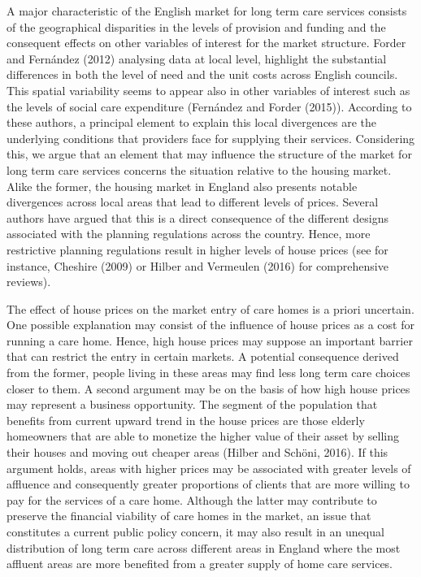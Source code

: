 \documentclass[11pt,a4paper,]{article}
\begin{document}
A major characteristic of the English market for long term care services
consists of the geographical disparities in the levels of provision and
funding and the consequent effects on other variables of interest for
the market structure. Forder and Fernández (2012) analysing data at
local level, highlight the substantial differences in both the level of
need and the unit costs across English councils. This spatial
variability seems to appear also in other variables of interest such as
the levels of social care expenditure (Fernández and Forder (2015)).
According to these authors, a principal element to explain this local
divergences are the underlying conditions that providers face for
supplying their services. Considering this, we argue that an element
that may influence the structure of the market for long term care
services concerns the situation relative to the housing market. Alike
the former, the housing market in England also presents notable
divergences across local areas that lead to different levels of prices.
Several authors have argued that this is a direct consequence of the
different designs associated with the planning regulations across the
country. Hence, more restrictive planning regulations result in higher
levels of house prices (see for instance, Cheshire (2009) or Hilber and
Vermeulen (2016) for comprehensive reviews).

The effect of house prices on the market entry of care homes is a priori
uncertain. One possible explanation may consist of the influence of
house prices as a cost for running a care home. Hence, high house prices
may suppose an important barrier that can restrict the entry in certain
markets. A potential consequence derived from the former, people living
in these areas may find less long term care choices closer to them. A
second argument may be on the basis of how high house prices may
represent a business opportunity. The segment of the population that
benefits from current upward trend in the house prices are those elderly
homeowners that are able to monetize the higher value of their asset by
selling their houses and moving out cheaper areas (Hilber and Schöni,
2016). If this argument holds, areas with higher prices may be
associated with greater levels of affluence and consequently greater
proportions of clients that are more willing to pay for the services of
a care home. Although the latter may contribute to preserve the
financial viability of care homes in the market, an issue that
constitutes a current public policy concern, it may also result in an
unequal distribution of long term care across different areas in England
where the most affluent areas are more benefited from a greater supply
of home care services.
\end{document}
